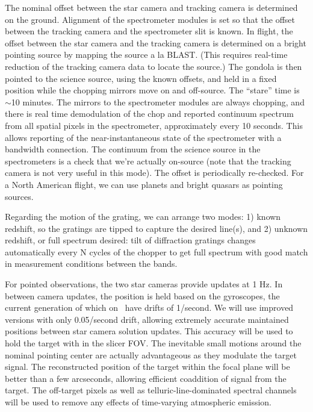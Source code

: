 The nominal offset between the star camera and tracking camera is determined on the ground.  Alignment of the spectrometer modules is set so that the offset between the tracking camera and the spectrometer slit is known.  In flight, the offset between the star camera and the tracking camera is determined on a bright pointing source by mapping the source a la BLAST.  (This requires real-time reduction of the tracking camera data to locate the source.)  The gondola is then pointed to the science source, using the known offsets, and held in a fixed position while the chopping mirrors move on and off-source.   The ``stare'' time is $\sim$10 minutes. The mirrors to the spectrometer modules are always chopping, and there is real time demodulation of the chop and reported continuum spectrum from all spatial pixels in the spectrometer, approximately every 10 seconds.  This allows reporting of the near-instantaneous state of the spectrometer with a bandwidth connection.    The continuum from the science source in the spectrometers is a check that we're actually on-source (note that the tracking camera is not very useful in this mode).    The offset is periodically re-checked.  For a North American flight, we can use planets and bright quasars as pointing sources.

Regarding the motion of the grating, we can arrange two modes: 1) known redshift, so the gratings are tipped to capture the desired line(s), and 2) unknown redshift, or full spectrum desired: tilt of diffraction gratings changes automatically every N cycles of the chopper to get full spectrum with good match in measurement conditions between the bands.


For pointed observations, the two star cameras provide updates at 1 Hz.  In between camera updates, the position is held based on the gyroscopes, the current generation of which on \blast\ have drifts of 1\arcsec/second.  We will use improved versions with only 0.05\arcsec/second drift, allowing extremely accurate maintained positions between star camera solution updates.  This accuracy will be used to hold the target with in the slicer FOV.  The inevitable small motions around the nominal pointing center are actually advantageous as they modulate the target signal.  The reconstructed position of the target within the focal plane will be better than a few arcseconds, allowing efficient coaddition of signal from the target.  The off-target pixels as well as telluric-line-dominated spectral channels will be used to remove any effects of time-varying atmospheric emission.

